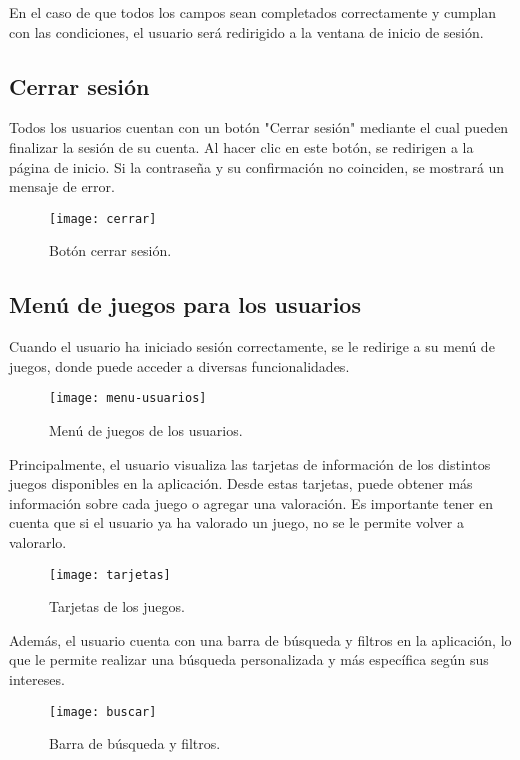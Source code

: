 En el caso de que todos los campos sean completados correctamente y cumplan con las condiciones, el usuario será redirigido a la ventana de inicio de sesión.

\subsection{Cerrar sesión}
Todos los usuarios cuentan con un botón "Cerrar sesión" mediante el cual pueden finalizar la sesión de su cuenta. Al hacer clic en este botón, se redirigen a la página de inicio.
Si la contraseña y su confirmación no coinciden, se mostrará un mensaje de error.

\begin{figure}[htb]
\centering
\texttt{[image: cerrar]}
\caption{Botón cerrar sesión.}
\label{fig:cerrar}
\end{figure}
\newpage

\subsection{Menú de juegos para los usuarios}
Cuando el usuario ha iniciado sesión correctamente, se le redirige a su menú de juegos, donde puede acceder a diversas funcionalidades.
\begin{figure}[htb]
\centering
\texttt{[image: menu-usuarios]}
\caption{Menú de juegos de los usuarios.}
\label{fig:menu-usuarios}
\end{figure}

Principalmente, el usuario visualiza las tarjetas de información de los distintos juegos disponibles en la aplicación. Desde estas tarjetas, puede obtener más información sobre cada juego o agregar una valoración. Es importante tener en cuenta que si el usuario ya ha valorado un juego, no se le permite volver a valorarlo.
\begin{figure}[htb]
\centering
\texttt{[image: tarjetas]}
\caption{Tarjetas de los juegos.}
\label{fig:tarjetas}
\end{figure}

Además, el usuario cuenta con una barra de búsqueda y filtros en la aplicación, lo que le permite realizar una búsqueda personalizada y más específica según sus intereses.
\begin{figure}[htb]
\centering
\texttt{[image: buscar]}
\caption{Barra de búsqueda y filtros.}
\label{fig:buscar}
\end{figure}

